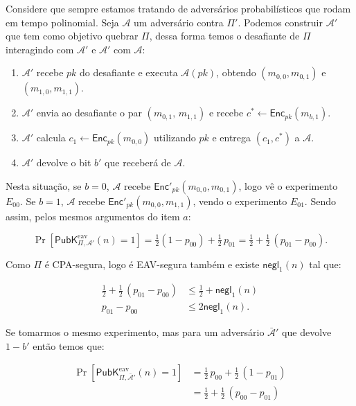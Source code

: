 \documentclass[11pt,a4paper]{article}
\newcommand{\Enc}{\mathsf{Enc}}
\newcommand{\negl}{\mathsf{negl}}
\newcommand{\PubKeav}[3]{\mathsf{PubK}^{\mathrm{eav}}_{#1,#2}(#3)}
\begin{document}
    Considere que sempre estamos tratando de adversários probabilísticos que rodam em tempo polinomial.
    Seja $\mathcal{A}$ um adversário contra $\Pi'$.
    Podemos construir $\mathcal{A}'$ que tem como objetivo quebrar $\Pi$, dessa forma temos o
    desafiante de $\Pi$ interagindo com $\mathcal{A}'$ e $\mathcal{A}'$ com $\mathcal{A}$:
    \begin{enumerate}
        \item $\mathcal{A}'$ recebe $pk$ do desafiante e executa $\mathcal{A}(pk)$, obtendo
        $(m_{0,0},m_{0,1})$ e $(m_{1,0},m_{1,1})$.
        \item $\mathcal{A}'$ envia ao desafiante o par $(m_{0,1},\, m_{1,1})$ e recebe
        $c^* \leftarrow \Enc_{pk}(m_{b,1})$.
        \item $\mathcal{A}'$ calcula $c_1 \leftarrow \Enc_{pk}(m_{0,0})$ utilizando $pk$ e entrega $(c_1, c^*)$ a $\mathcal{A}$.
        \item $\mathcal{A}'$ devolve o bit $b'$ que receberá de $\mathcal{A}$.
    \end{enumerate}

    Nesta situação, se $b=0$, $\mathcal{A}$ recebe $\Enc'_{pk}(m_{0,0},m_{0,1})$, logo vê o experimento $E_{00}$.
    Se $b=1$, $\mathcal{A}$ recebe $\Enc'_{pk}(m_{0,0},m_{1,1})$, vendo o experimento $E_{01}$.
    Sendo assim, pelos mesmos argumentos do item $a$:

    \[
        \Pr\!\left[\PubKeav{\Pi}{\mathcal{A}'}{n}=1\right]
        = \tfrac12(1-p_{00}) + \tfrac12\,p_{01}
        = \tfrac12 + \tfrac12\,(p_{01}-p_{00}).
    \]

    Como $\Pi$ é CPA-segura, logo é EAV-segura também e existe $\negl_1(n)$ tal que:

    \begin{align*}
        \tfrac12 + \tfrac12\,(p_{01}-p_{00}) &\le \tfrac12 + \negl_1(n)\\
        p_{01}-p_{00} &\le 2\negl_1(n).
    \end{align*}

    Se tomarmos o mesmo experimento, mas para um adversário $\bar{\mathcal{A}}'$ que devolve $1-b'$ então temos que:

    \begin{align*}
        \Pr\!\left[\PubKeav{\Pi}{\bar{\mathcal{A}}'}{n}=1\right]
        &= \tfrac12\,p_{00} + \tfrac12\,(1-p_{01})\\
        &= \tfrac12 + \tfrac12\,(p_{00}-p_{01})
    \end{align*}
\end{document}
